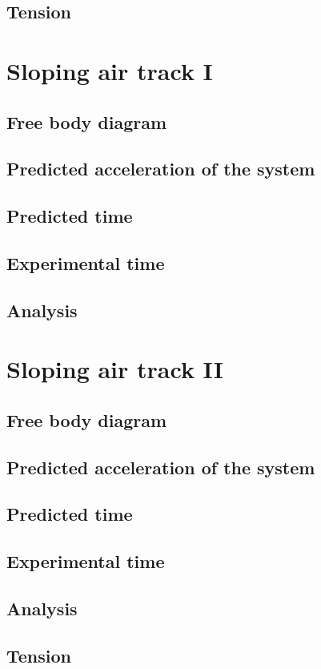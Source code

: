 \documentclass[11pt, letterpaper, includehead]{article}
\begin{document}
\subsection{Tension} %
\section{Sloping air track I} %
\subsection{Free body diagram}
\subsection{Predicted acceleration of the system}
\subsection{Predicted time}
\subsection{Experimental time}
\subsection{Analysis}
\section{Sloping air track II} %
\subsection{Free body diagram}
\subsection{Predicted acceleration of the system}
\subsection{Predicted time}
\subsection{Experimental time}
\subsection{Analysis}
\subsection{Tension}
\end{document}
